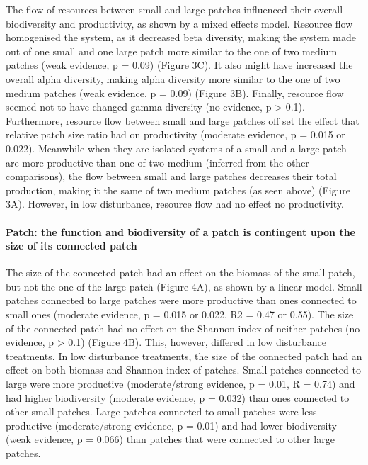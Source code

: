 \documentclass[
]{article}
\begin{document}
The flow of resources between small and large patches influenced their
overall biodiversity and productivity, as shown by a mixed effects
model. Resource flow homogenised the system, as it decreased beta
diversity, making the system made out of one small and one large patch
more similar to the one of two medium patches (weak evidence, p = 0.09)
(Figure 3C). It also might have increased the overall alpha diversity,
making alpha diversity more similar to the one of two medium patches
(weak evidence, p = 0.09) (Figure 3B). Finally, resource flow seemed not
to have changed gamma diversity (no evidence, p \textgreater{} 0.1).
Furthermore, resource flow between small and large patches off set the
effect that relative patch size ratio had on productivity (moderate
evidence, p = 0.015 or 0.022). Meanwhile when they are isolated systems
of a small and a large patch are more productive than one of two medium
(inferred from the other comparisons), the flow between small and large
patches decreases their total production, making it the same of two
medium patches (as seen above) (Figure 3A). However, in low disturbance,
resource flow had no effect no productivity.

\hypertarget{patch-the-function-and-biodiversity-of-a-patch-is-contingent-upon-the-size-of-its-connected-patch}{%
\paragraph{Patch: the function and biodiversity of a patch is contingent
upon the size of its connected
patch}\label{patch-the-function-and-biodiversity-of-a-patch-is-contingent-upon-the-size-of-its-connected-patch}}

The size of the connected patch had an effect on the biomass of the
small patch, but not the one of the large patch (Figure 4A), as shown by
a linear model. Small patches connected to large patches were more
productive than ones connected to small ones (moderate evidence, p =
0.015 or 0.022, R2 = 0.47 or 0.55). The size of the connected patch had
no effect on the Shannon index of neither patches (no evidence, p
\textgreater{} 0.1) (Figure 4B). This, however, differed in low
disturbance treatments. In low disturbance treatments, the size of the
connected patch had an effect on both biomass and Shannon index of
patches. Small patches connected to large were more productive
(moderate/strong evidence, p = 0.01, R = 0.74) and had higher
biodiversity (moderate evidence, p = 0.032) than ones connected to other
small patches. Large patches connected to small patches were less
productive (moderate/strong evidence, p = 0.01) and had lower
biodiversity (weak evidence, p = 0.066) than patches that were connected
to other large patches.
\end{document}
